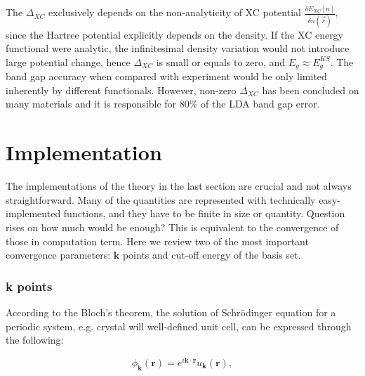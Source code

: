 The $\Delta_{XC}$ exclusively depends on the non-analyticity of XC potential $\frac{\delta E_{XC}[n]}{\delta n(\vec{r})}$, since the Hartree potential explicitly depends on the density. If the XC energy functional were analytic, the infinitesimal density variation would not introduce large potential change, hence $\Delta_{XC}$ is small or equals to zero, and $E_g \approx E^{KS}_g$. The band gap accuracy when compared with experiment would be only limited inherently by different functionals. However, non-zero $\Delta_{XC}$ has been concluded on many materials and it is responsible for 80\% of the LDA band gap error\cite{Godby1988}. 

\section{Implementation}

The implementations of the theory in the last section are crucial and not always straightforward. Many of the quantities are represented with technically easy-implemented functions, and they have to be finite in size or quantity. Question rises on how much would be enough? This is equivalent to the convergence of those in computation term. Here we review two of the most important convergence parameters: $\mathbf{k}$ points and cut-off energy of the basis set.

\subsubsection{k points}

According to the Bloch's theorem, the solution of Schr\"{o}dinger equation for a periodic system, e.g. crystal will well-defined unit cell, can be expressed through the  following:

\begin{equation}\label{imp:bloch}
\phi_{\mathbf{k}}(\mathbf{r})=e^{i\mathbf{k}\cdot\mathbf{r}}u_{\mathbf{k}}(\mathbf{r}),
\end{equation}

